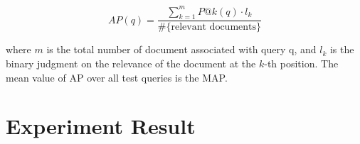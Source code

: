 \begin{displaymath}
AP(q) = \frac{\sum_{k=1}^m P@k(q) \cdot l_k}{\#\text{\{relevant documents\}}}
\end{displaymath}

where \(m\) is the total number of document associated with query q, and \(l_k\) is the binary judgment on the relevance of the document at the \(k\)-th position. The mean value of AP over all test queries is the MAP. 

\section{Experiment Result}





